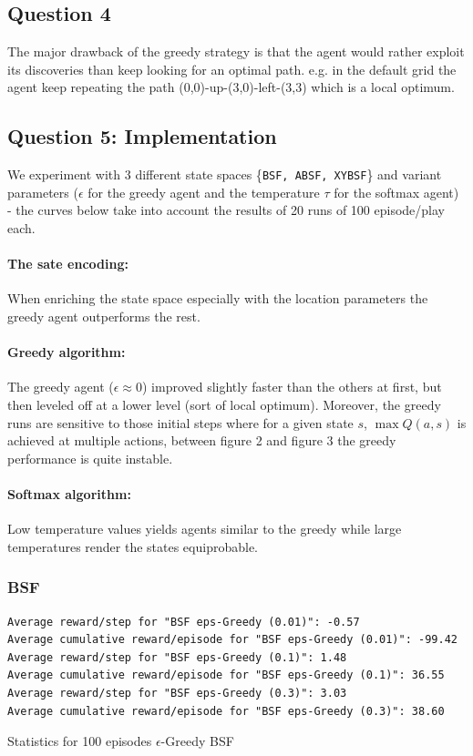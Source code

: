\documentclass[11pt, a4paper]{article}
\begin{document}
\subsection*{Question 4}
The major drawback of the greedy strategy is that the agent would rather exploit its discoveries than keep looking for an optimal path. e.g. in the default grid the agent keep repeating the path (0,0)-up-(3,0)-left-(3,3) which is a local optimum. 


\subsection*{Question 5: Implementation}
We experiment with 3 different state spaces \{\texttt{BSF, ABSF, XYBSF}\} and variant parameters ($\epsilon$ for the greedy agent and the temperature $\tau$ for the softmax agent) - the curves below take into account the results of 20 runs of 100 episode/play each.
\paragraph{The sate encoding:}
When enriching the state space especially with the location parameters the greedy agent outperforms the rest.

\paragraph{Greedy algorithm:}
The greedy agent ($\epsilon \approx 0$) improved slightly faster than the others at first, but then leveled off at a lower level (sort of local optimum). Moreover, the greedy runs are sensitive to those initial steps where for a given state $s$, $\max Q(a,s)$ is achieved at multiple actions, between figure 2 and figure 3 the greedy performance is quite instable.

\paragraph{Softmax algorithm:}
Low temperature values yields agents similar to the greedy while large temperatures render the states equiprobable.
\subsubsection*{BSF}
\begin{listing}
\begin{verbatim}
Average reward/step for "BSF eps-Greedy (0.01)": -0.57
Average cumulative reward/episode for "BSF eps-Greedy (0.01)": -99.42
Average reward/step for "BSF eps-Greedy (0.1)": 1.48
Average cumulative reward/episode for "BSF eps-Greedy (0.1)": 36.55
Average reward/step for "BSF eps-Greedy (0.3)": 3.03
Average cumulative reward/episode for "BSF eps-Greedy (0.3)": 38.60
\end{verbatim}
\caption{Statistics for 100 episodes $\epsilon$-Greedy BSF}
\end{listing}
\end{document}
